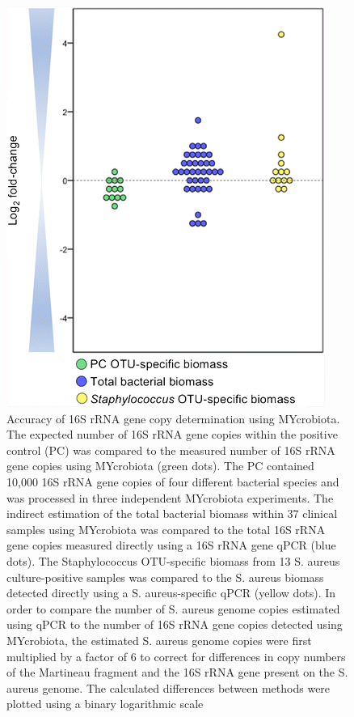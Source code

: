 \begin{figure}[t!]
\centering
\includegraphics[scale=0.75]{chapters/images/mycrobiota/mycrobiota-fig2.png}
\caption{Accuracy of 16S rRNA gene copy determination using MYcrobiota. The expected number of 16S rRNA gene copies within the positive control (PC) was compared to the measured number of 16S rRNA gene copies using MYcrobiota (green dots). The PC contained 10,000 16S rRNA gene copies of four different bacterial species and was processed in three independent MYcrobiota experiments. The indirect estimation of the total bacterial biomass within 37 clinical samples using MYcrobiota was compared to the total 16S rRNA gene copies measured directly using a 16S rRNA gene qPCR (blue dots). The Staphylococcus OTU-specific biomass from 13 S. aureus culture-positive samples was compared to the S. aureus biomass detected directly using a S. aureus-specific qPCR (yellow dots). In order to compare the number of S. aureus genome copies estimated using qPCR to the number of 16S rRNA gene copies detected using MYcrobiota, the estimated S. aureus genome copies were first multiplied by a factor of 6 to correct for differences in copy numbers of the Martineau fragment and the 16S rRNA gene present on the S. aureus genome. The calculated differences between methods were plotted using a binary logarithmic scale}
\label{fig:accuracy}
\end{figure}


